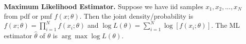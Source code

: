 \documentclass[border=3bp]{standalone}
\begin{document}
\begin{minipage}{3.5in}
\textbf{Maximum Likelihood Estimator.} Suppose we have iid samples $x_1, x_2, ..., x_N$ from pdf or pmf $f(x; \theta)$. Then the joint density/probability is $f(x; \theta) = \prod_{i = 1}^N f(x_i; \theta)$ and $\log L(\theta) = \sum_{i = 1}^N \log \left[ f(x_i; \theta) \right]$. The ML estimator $\hat{\theta}$ of $\theta$ is $\arg \max \log L(\theta)$.
\end{minipage}
\end{document}
